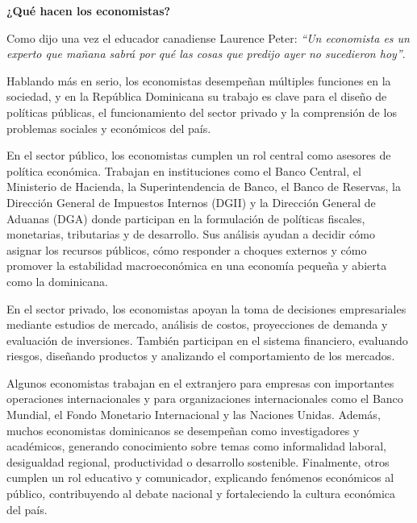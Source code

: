 \documentclass[
  letterpaper,
  DIV=11,
  numbers=noendperiod,
  oneside]{scrreprt}
\begin{document}
\begin{tcolorbox}[enhanced jigsaw, breakable, toprule=.15mm, colframe=quarto-callout-note-color-frame, leftrule=.75mm, opacityback=0, colback=white, bottomrule=.15mm, left=2mm, arc=.35mm, rightrule=.15mm]
\begin{minipage}[t]{5.5mm}
\textcolor{quarto-callout-note-color}{\faInfo}
\end{minipage}%
\begin{minipage}[t]{\textwidth - 5.5mm}

\vspace{-3mm}\textbf{¿Qué hacen los economistas?}\vspace{3mm}

Como dijo una vez el educador canadiense Laurence Peter: \emph{``Un
economista es un experto que mañana sabrá por qué las cosas que predijo
ayer no sucedieron hoy''}.

Hablando más en serio, los economistas desempeñan múltiples funciones en
la sociedad, y en la República Dominicana su trabajo es clave para el
diseño de políticas públicas, el funcionamiento del sector privado y la
comprensión de los problemas sociales y económicos del país.

En el sector público, los economistas cumplen un rol central como
asesores de política económica. Trabajan en instituciones como el Banco
Central, el Ministerio de Hacienda, la Superintendencia de Banco, el
Banco de Reservas, la Dirección General de Impuestos Internos (DGII) y
la Dirección General de Aduanas (DGA) donde participan en la formulación
de políticas fiscales, monetarias, tributarias y de desarrollo. Sus
análisis ayudan a decidir cómo asignar los recursos públicos, cómo
responder a choques externos y cómo promover la estabilidad
macroeconómica en una economía pequeña y abierta como la dominicana.

En el sector privado, los economistas apoyan la toma de decisiones
empresariales mediante estudios de mercado, análisis de costos,
proyecciones de demanda y evaluación de inversiones. También participan
en el sistema financiero, evaluando riesgos, diseñando productos y
analizando el comportamiento de los mercados.

Algunos economistas trabajan en el extranjero para empresas con
importantes operaciones internacionales y para organizaciones
internacionales como el Banco Mundial, el Fondo Monetario Internacional
y las Naciones Unidas. Además, muchos economistas dominicanos se
desempeñan como investigadores y académicos, generando conocimiento
sobre temas como informalidad laboral, desigualdad regional,
productividad o desarrollo sostenible. Finalmente, otros cumplen un rol
educativo y comunicador, explicando fenómenos económicos al público,
contribuyendo al debate nacional y fortaleciendo la cultura económica
del país.

\end{minipage}%
\end{tcolorbox}
\end{document}
